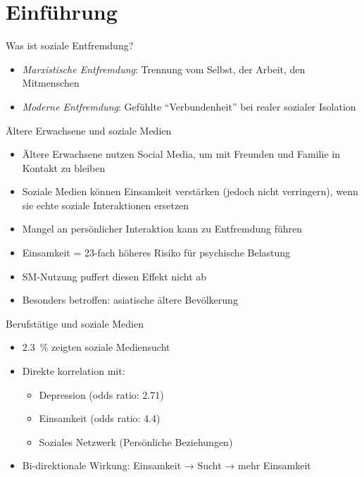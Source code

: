 
\section{Einführung}\label{sec:einfuhrung}
\begin{frame}{Was ist soziale Entfremdung?~\cite{rey_alienation_2012}}
    \begin{itemize}
        \item \textit{Marxistische Entfremdung}: Trennung vom Selbst, der Arbeit, den Mitmenschen
        \item \textit{Moderne Entfremdung}: Gefühlte \enquote{Verbundenheit} bei realer sozialer Isolation
    \end{itemize}
\end{frame}
\begin{frame}{Ältere Erwachsene und soziale Medien~\cite{siddiq_social_2024}}
    \begin{itemize}
        \item Ältere Erwachsene nutzen Social Media, um mit Freunden und Familie in Kontakt zu bleiben
        \item Soziale Medien können Einsamkeit verstärken (jedoch nicht verringern), wenn sie echte soziale Interaktionen ersetzen
        \item Mangel an persönlicher Interaktion kann zu Entfremdung führen
        \item Einsamkeit = 23-fach höheres Risiko für psychische Belastung
        \item SM-Nutzung puffert diesen Effekt nicht ab
        \item Besonders betroffen: asiatische ältere Bevölkerung
    \end{itemize}
\end{frame}
\begin{frame}{Berufstätige und soziale Medien~\cite{santini_social_2024}}
    \begin{itemize}
        \item \SI{2,3}{\percent} zeigten soziale Mediensucht
        \item Direkte korrelation mit:
        \begin{itemize}
            \item Depression (odds ratio: 2.71)
            \item Einsamkeit (odds ratio: 4.4)
            \item Soziales Netzwerk (Persönliche Beziehungen)
        \end{itemize}
        \item Bi-direktionale Wirkung: Einsamkeit → Sucht → mehr Einsamkeit
    \end{itemize}
\end{frame}
